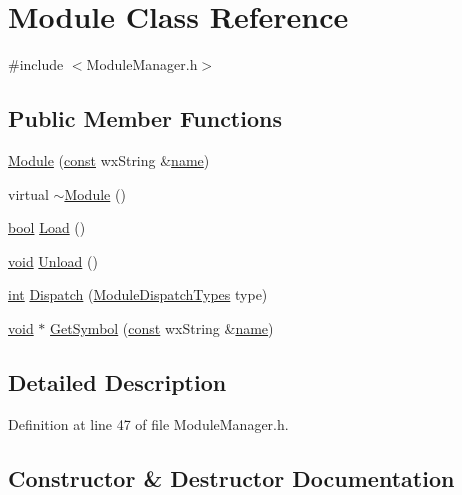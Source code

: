 \hypertarget{class_module}{}\section{Module Class Reference}
\label{class_module}


{\ttfamily \#include $<$Module\+Manager.\+h$>$}

\subsection*{Public Member Functions}
\begin{DoxyCompactItemize}
\item 
\hyperlink{class_module_aadbe3841de08baf7fdb0cbc79a1456e3}{Module} (\hyperlink{getopt1_8c_a2c212835823e3c54a8ab6d95c652660e}{const} wx\+String \&\hyperlink{lib_2expat_8h_a1b49b495b59f9e73205b69ad1a2965b0}{name})
\item 
virtual \hyperlink{class_module_a7c9d9c096786d127590fdd8aa2b7d681}{$\sim$\+Module} ()
\item 
\hyperlink{mac_2config_2i386_2lib-src_2libsoxr_2soxr-config_8h_abb452686968e48b67397da5f97445f5b}{bool} \hyperlink{class_module_aa3f113deceb672bd13b9c7f8c2476c0f}{Load} ()
\item 
\hyperlink{sound_8c_ae35f5844602719cf66324f4de2a658b3}{void} \hyperlink{class_module_af11472ff1fa98836eed501b51c01fcbc}{Unload} ()
\item 
\hyperlink{xmltok_8h_a5a0d4a5641ce434f1d23533f2b2e6653}{int} \hyperlink{class_module_ac8fbea5e6664d2e30846ceeb2d0bc0d9}{Dispatch} (\hyperlink{_scripter_callback_8cpp_a9f2f762f76ca014f9381eeabccdef359}{Module\+Dispatch\+Types} type)
\item 
\hyperlink{sound_8c_ae35f5844602719cf66324f4de2a658b3}{void} $\ast$ \hyperlink{class_module_a65f9fbaffd0e23f6e27c20ec1a812dc4}{Get\+Symbol} (\hyperlink{getopt1_8c_a2c212835823e3c54a8ab6d95c652660e}{const} wx\+String \&\hyperlink{lib_2expat_8h_a1b49b495b59f9e73205b69ad1a2965b0}{name})
\end{DoxyCompactItemize}


\subsection{Detailed Description}


Definition at line 47 of file Module\+Manager.\+h.



\subsection{Constructor \& Destructor Documentation}
